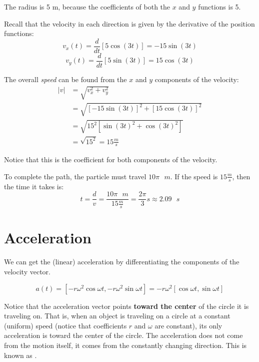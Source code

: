 \begin{Answer}[ref = particle]
  The radius is 5 m, because the coefficients of both the $x$ and $y$ functions is 5.

  Recall that the velocity in each direction is given by the derivative of the position functions:
  $$v_x(t) = \frac{d}{dt} \left[ 5 \cos{ \left( 3t \right)} \right] = -15 \sin{ \left( 3t \right)}$$
  $$v_y(t) = \frac{d}{dt} \left[ 5 \sin{ \left( 3t \right)} \right] = 15 \cos{ \left( 3t \right)}$$

  The overall \textit{speed} can be found from the $x$ and $y$ components of the velocity:
  \begin{align*}
    |v| & = \sqrt{v_x^2 + v_y^2}                                                              \\ &= \sqrt{\left[ -15 \sin{ \left( 3t \right) } \right]^2 + \left[ 15 \cos{ \left( 3t \right)} \right]^2} \\
        & = \sqrt{15^2 \left[ \sin{ \left(3t \right)}^2 + \cos{ \left( 3t \right)}^2 \right]} \\ &= \sqrt{15^2} = 15 \frac{m}{s}
  \end{align*}

  Notice that this is the coefficient for both components of the velocity.

  To complete the path, the particle must travel $10\pi \text{ } m$. If the speed is $15 \frac{m}{s}$, then the time it takes is:
  $$t = \frac{d}{v} = \frac{10\pi \text{ } m}{15 \frac{m}{s}} = \frac{2\pi}{3} s \approx 2.09 \text{ } s$$
\end{Answer}

\section{Acceleration}

We can get the (linear) acceleration by differentiating the components of the velocity vector.

$$a(t) = \left[-r \omega^2 \cos{\omega t}, -r \omega^2 \sin{\omega t} \right] = -r\omega^2 \left[\cos{\omega t}, \sin{\omega t}\right]$$

Notice that the acceleration vector points \textbf{toward the center} of the
circle it is traveling on. That is, when an object is traveling on a
circle at a constant (uniform) speed (notice that coefficients $r$ and $\omega$ are constant), its only acceleration is toward the center of the circle. The acceleration does not come from the motion itself, it comes from the constantly changing direction. This is known as . 

